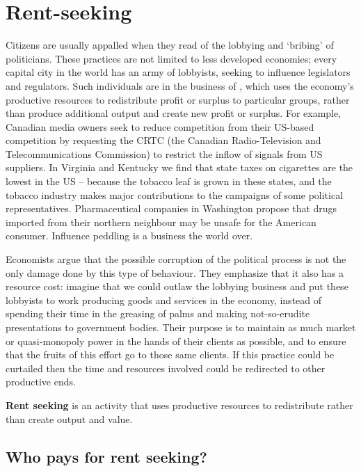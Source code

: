 \section{Rent-seeking}\label{sec:ch10sec7}

Citizens are usually appalled when they read of the lobbying and `bribing' of politicians. These practices are not limited to less developed economies; every capital city in the world has an army of lobbyists, seeking to influence legislators and regulators. Such individuals are in the business of , which uses the economy's productive resources to redistribute profit or surplus to particular groups, rather than produce additional output and create new profit or surplus. For example, Canadian media owners  seek to reduce competition from their US-based competition by requesting the CRTC (the Canadian Radio-Television and Telecommunications Commission) to restrict the inflow of signals from US suppliers. In Virginia and Kentucky we find that state taxes on cigarettes are the lowest in the US -- because the tobacco leaf is grown in these states, and the tobacco industry makes major contributions to the campaigns of some political representatives. Pharmaceutical companies in Washington propose that drugs imported from their northern neighbour may be unsafe for the American consumer.  Influence peddling is a business the world over.

Economists argue that the possible corruption of the political process is not the only damage done by this type of behaviour. They emphasize that it also has a resource cost:  imagine that we could outlaw the lobbying business and put these lobbyists to work producing goods and services in the economy, instead of spending their time in the greasing of palms and making not-so-erudite presentations to government bodies.  Their purpose is to maintain as much market or quasi-monopoly power in the hands of their clients as possible, and to ensure that the fruits of this effort go to those same clients. If this practice could be curtailed then the time and resources involved could be redirected to other productive ends.

\begin{DefBox}
\textbf{Rent seeking} is an activity that uses productive resources to redistribute rather than create output and value.
\end{DefBox}

\subsection*{Who pays for rent seeking?}

